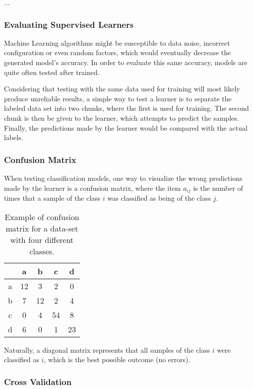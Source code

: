 ...

\subsubsection{Evaluating Supervised Learners}

Machine Learning algorithms might be susceptible to data noise, incorrect configuration or even random factors, which would eventually decrease the generated model's accuracy. In order to evaluate this same accuracy, models are quite often tested after trained.

Considering that testing with the same data used for training will most likely produce unreliable results, a simple way to test a learner is to separate the labeled data set into two chunks, where the first is used for training. The second chunk is then be given to the learner, which attempts to predict the samples. Finally, the predictions made by the learner would be compared with the actual labels.

\subsubsection{Confusion Matrix}

When testing classification models, one way to visualize the wrong predictions made by the learner is a confusion matrix, where the item $a_{ij}$ is the number of times that a sample of the class $i$ was classified as being of the class $j$.

\begin{table}[H]
	\centering
	\begin{tabular}{ |c || *{4}{c|} }
		\hline
           &   a &   b &   c &   d \\\hline\hline
		a & 12 &   3 &   2 &   0 \\
		b &   7 & 12 &   2 &   4 \\
		c &   0 &   4 & 54 &   8 \\
		d &   6 &   0 &   1 & 23 \\\hline
	\end{tabular}

	\caption{Example of confusion matrix for a data-set with four different classes.}
\end{table}

Naturally, a diagonal matrix represents that all samples of the class $i$ were classified as $i$, which is the best possible outcome (no errors).

\subsubsection{Cross Validation}

